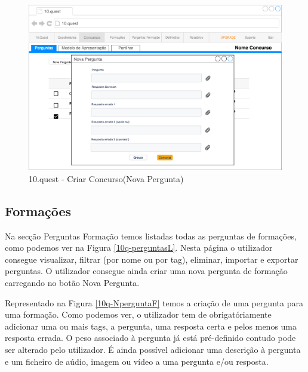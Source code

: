 \begin{figure}[ht!]
	\begin{center}
		\includegraphics[width=1\textwidth]{img/prototipos/19.png}
		\caption{10.quest - Criar Concurso(Nova Pergunta)}
		\label{10q-Npergunta}
	\end{center}
\end{figure}

\newpage

\subsection{Formações}

Na secção Perguntas Formação temos listadas todas as perguntas de formações, como podemos ver na Figura \ref{10q-perguntasL}. Nesta página o utilizador consegue visualizar, filtrar (por nome ou por tag), eliminar, importar e exportar perguntas. O utilizador consegue ainda criar uma nova pergunta de formação carregando no botão Nova Pergunta.

Representado na Figura \ref{10q-NperguntaF} temos a criação de uma pergunta para uma formação. Como podemos ver, o utilizador tem de obrigatóriamente adicionar uma ou mais tags, a pergunta, uma resposta certa e pelos menos uma resposta errada. O peso associado à pergunta já está pré-definido contudo pode ser alterado pelo utilizador. É ainda possível adicionar uma descrição à pergunta e um ficheiro de aúdio, imagem ou vídeo a uma pergunta e/ou resposta.

